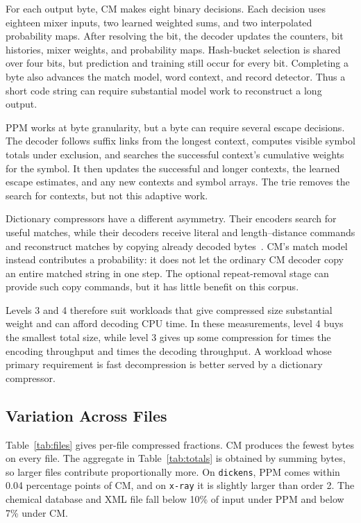 \documentclass[10pt,letterpaper]{article}
\newcommand{\code}[1]{\texttt{#1}}
\begin{document}
For each output byte, CM makes eight binary decisions. Each decision uses eighteen mixer inputs, two learned weighted sums, and two interpolated probability maps. After resolving the bit, the decoder updates the counters, bit histories, mixer weights, and probability maps. Hash-bucket selection is shared over four bits, but prediction and training still occur for every bit. Completing a byte also advances the match model, word context, and record detector. Thus a short code string can require substantial model work to reconstruct a long output.

PPM works at byte granularity, but a byte can require several escape decisions. The decoder follows suffix links from the longest context, computes visible symbol totals under exclusion, and searches the successful context's cumulative weights for the symbol. It then updates the successful and longer contexts, the learned escape estimates, and any new contexts and symbol arrays. The trie removes the search for contexts, but not this adaptive work.

Dictionary compressors have a different asymmetry. Their encoders search for useful matches, while their decoders receive literal and length--distance commands and reconstruct matches by copying already decoded bytes~\cite{xz,zstd}. CM's match model instead contributes a probability: it does not let the ordinary CM decoder copy an entire matched string in one step. The optional repeat-removal stage can provide such copy commands, but it has little benefit on this corpus.

Levels 3 and 4 therefore suit workloads that give compressed size substantial weight and can afford decoding CPU time. In these measurements, level 4 buys the smallest total size, while level 3 gives up some compression for \PpmCMEncodeRatio{} times the encoding throughput and \PpmCMDecodeRatio{} times the decoding throughput. A workload whose primary requirement is fast decompression is better served by a dictionary compressor.

\subsection{Variation Across Files}
Table~\ref{tab:files} gives per-file compressed fractions. CM produces the fewest bytes on every file. The aggregate in Table~\ref{tab:totals} is obtained by summing bytes, so larger files contribute proportionally more. On \code{dickens}, PPM comes within 0.04 percentage points of CM, and on \code{x-ray} it is slightly larger than order 2. The chemical database and XML file fall below 10\% of input under PPM and below 7\% under CM.
\end{document}
